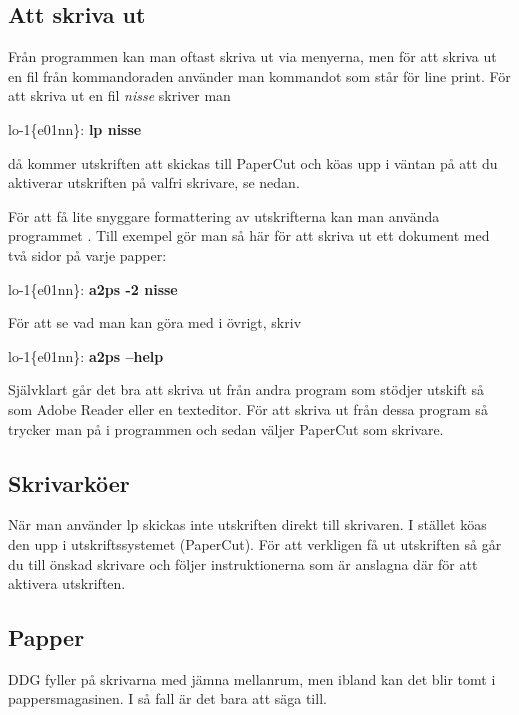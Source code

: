 \documentclass[a4paper,twocolumn]{book}
\begin{document}
\subsection{Att skriva ut}

Från programmen kan man oftast skriva ut via menyerna, men för att skriva ut
en fil från kommandoraden använder man kommandot  som står
för line print. För att skriva ut en fil \emph{nisse} skriver man
\begin{example}
lo-1\{e01nn\}: \textbf{lp nisse}
\end{example}
då kommer utskriften att skickas till PaperCut och köas upp i väntan på att du aktiverar utskriften på valfri skrivare, se nedan.

För att få lite snyggare formattering av utskrifterna kan man använda
programmet . Till exempel gör man så här för att skriva ut ett
dokument med två sidor på varje papper:
\begin{example}
lo-1\{e01nn\}: \textbf{a2ps -2 nisse}
\end{example}
För att se vad man kan göra med  i övrigt, skriv
\begin{example}
lo-1\{e01nn\}: \textbf{a2ps --help}
\end{example}

Självklart går det bra att skriva ut från andra program som stödjer utskift
så som Adobe Reader eller en texteditor. För att skriva ut från dessa program
så trycker man på  i programmen och sedan väljer PaperCut som skrivare.

\subsection{Skrivarköer}

När man använder lp skickas inte utskriften direkt
till skrivaren. I stället köas den upp i utskriftssystemet (PaperCut). För att verkligen få ut utskriften så går du till önskad skrivare och följer instruktionerna som är anslagna där för att aktivera utskriften.

\subsection{Papper}

 DDG fyller på skrivarna med jämna mellanrum, men ibland
kan det blir tomt i pappersmagasinen. I så fall är det bara att säga till.
\end{document}
